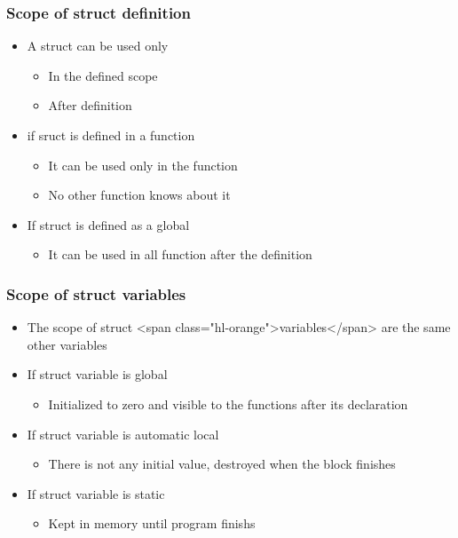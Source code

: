 \documentclass{../c-lecture}
\begin{document}
\begin{frame}
  \frametitle{Scope of struct definition}
  \begin{itemize}
    \item A struct can be used only
    \begin{itemize}
      \item In the defined scope
      \item After definition
    \end{itemize}
    \item if sruct is defined in a function
    \begin{itemize}
      \item It can be used only in the function
      \item No other function knows about it
    \end{itemize}
    \item If struct is defined as a global
    \begin{itemize}
      \item It can be used in all function after the definition
    \end{itemize}
  \end{itemize}
\end{frame}
\begin{frame}
  \frametitle{Scope of struct variables}
  \begin{itemize}
    \item
      The scope of struct <span class="hl-orange">variables</span> are the same
      other variables

    \item If struct variable is global
    \begin{itemize}
      \item
        Initialized to zero and visible to the functions after its declaration

    \end{itemize}
    \item If struct variable is automatic local
    \begin{itemize}
      \item There is not any initial value, destroyed when the block finishes
    \end{itemize}
    \item If struct variable is static
    \begin{itemize}
      \item Kept in memory until program finishs
    \end{itemize}
  \end{itemize}
\end{frame}
\end{document}
